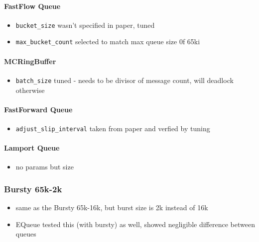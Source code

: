 \paragraph{FastFlow Queue}
\begin{itemize}
    \item \texttt{bucket\_size} wasn't specified in paper, tuned
    \item \texttt{max\_bucket\_count} selected to match max queue size 0f 65ki
\end{itemize}

\paragraph{MCRingBuffer}
\begin{itemize}
    \item \texttt{batch\_size} tuned - needs to be divisor of message count, will deadlock otherwise
\end{itemize}

\paragraph{FastForward Queue}
\begin{itemize}
    \item \texttt{adjust\_slip\_interval} taken from paper and verfied by tuning
\end{itemize}

\paragraph{Lamport Queue}
\begin{itemize}
    \item no params but size
\end{itemize}

\subsubsection{Bursty 65k-2k}
\begin{itemize}
    \item same as the Bursty 65k-16k, but burst size is 2k instead of 16k
    \item EQueue tested this (with bursty) as well, showed negligible difference between queues
\end{itemize}

